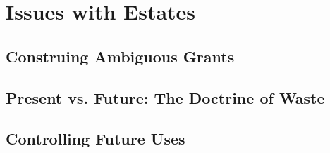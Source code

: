 \chapter{Issues with Estates}

\section{Construing Ambiguous Grants}






\begin{questions}

\end{questions}



\section{Present vs. Future: The Doctrine of Waste}






\begin{questions}

\end{questions}




\section{Controlling Future Uses}





\begin{questions}

\end{questions}




\begin{questions}

\end{questions}




\begin{questions}

\end{questions}

